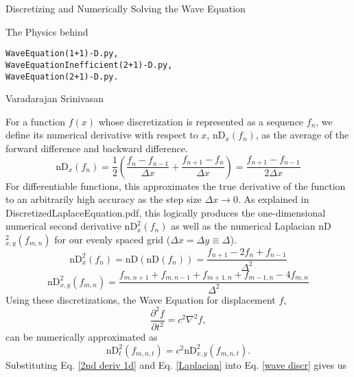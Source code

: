 \documentclass{article}
\begin{document}
\begin{flushleft}
{\large Discretizing and Numerically Solving the Wave Equation}
\end{flushleft}
The Physics behind
\vspace{-2ex}
\begin{verbatim}
WaveEquation(1+1)-D.py,
WaveEquationInefficient(2+1)-D.py,
WaveEquation(2+1)-D.py.
\end{verbatim}
\begin{flushright}
\bigskip
Varadarajan Srinivasan
\end{flushright}

\smallskip

For a function $f(x)$ whose discretization is represented as a sequence $f_n$, we define its numerical derivative with respect to $x$, nD$_x(f_n)$, as the average of the forward difference and backward difference.
\begin{equation} \label{1st deriv 1d}
\mbox{nD}_x(f_n)=\frac{1}{2}\left(\frac{f_{n}-f_{n-1}}{\Delta x}+\frac{f_{n+1}-f_n}{\Delta x}\right)=\frac{f_{n+1}-f_{n-1}}{2\Delta x}
\end{equation}
For differentiable functions, this approximates the true derivative of the function to an arbitrarily high accuracy as the step size $\Delta x \rightarrow 0$. As explained in DiscretizedLaplaceEquation.pdf, this logically produces the one-dimensional numerical second derivative $\mbox{nD}_x^2(f_n)$ as well as the numerical Laplacian nD$_{x,y}^2(f_{m,n})$ for our evenly spaced grid ($\Delta x = \Delta y \equiv \Delta$).
\begin{equation} \label{2nd deriv 1d}
\mbox{nD}_x^2(f_n)=\mbox{nD}(\mbox{nD}(f_n))=\frac{f_{n+1}-2f_{n}+f_{n-1}}{\Delta^2}
\end{equation}
\begin{equation} \label{Laplacian}
\mbox{nD}_{x,y}^2(f_{m,n})=\frac{f_{m,n+1}+f_{m,n-1}+f_{m+1,n}+f_{m-1,n}-4f_{m,n}}{\Delta^2}
\end{equation}
Using these discretizations, the Wave Equation for displacement $f$,
\begin{equation} \label{wave equation}
\frac{\partial^2f}{\partial t^2}=c^2\nabla^2f,
\end{equation}
can be numerically approximated as
\begin{equation} \label{wave discr}
\mbox{nD}_t^2(f_{m,n,t})=c^2\mbox{nD}_{x,y}^2(f_{m,n,t}).
\end{equation}
Substituting Eq. \ref{2nd deriv 1d} and Eq. \ref{Laplacian} into Eq. \ref{wave discr} gives us
\end{document}
